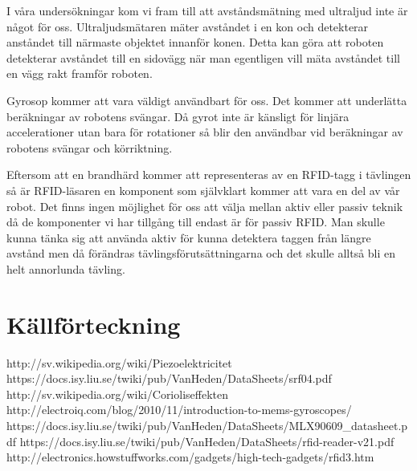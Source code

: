 \documentclass[a4paper,12pt,fleqn]{article}
\begin{document}
I våra undersökningar kom vi fram till att avståndsmätning med ultraljud inte är något för oss. Ultraljudsmätaren mäter avståndet i en kon och detekterar anståndet till närmaste objektet innanför konen. Detta kan göra att roboten detekterar avståndet till en sidovägg när man egentligen vill mäta avståndet till en vägg rakt framför roboten.

Gyrosop kommer att vara väldigt användbart för oss. Det kommer att underlätta beräkningar av robotens svängar. Då gyrot inte är känsligt för linjära accelerationer utan bara för rotationer så blir den användbar vid beräkningar av robotens svängar och körriktning.

Eftersom att en brandhärd kommer att representeras av en RFID-tagg i tävlingen så är RFID-läsaren en komponent som självklart kommer att vara en del av vår robot. Det finns ingen möjlighet för oss att välja mellan aktiv eller passiv teknik då de komponenter vi har tillgång till endast är för passiv RFID. Man skulle kunna tänka sig att använda aktiv för kunna detektera taggen från längre avstånd men då förändras tävlingsförutsättningarna och det skulle alltså bli en helt annorlunda tävling.

\section{Källförteckning}
http://sv.wikipedia.org/wiki/Piezoelektricitet
https://docs.isy.liu.se/twiki/pub/VanHeden/DataSheets/srf04.pdf
http://sv.wikipedia.org/wiki/Corioliseffekten
http://electroiq.com/blog/2010/11/introduction-to-mems-gyroscopes/
https://docs.isy.liu.se/twiki/pub/VanHeden/DataSheets/MLX90609_datasheet.pdf
https://docs.isy.liu.se/twiki/pub/VanHeden/DataSheets/rfid-reader-v21.pdf
http://electronics.howstuffworks.com/gadgets/high-tech-gadgets/rfid3.htm
\end{document}
